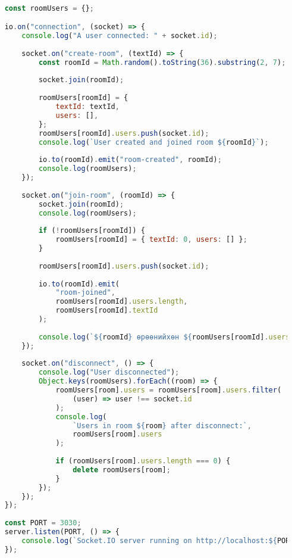 \begin{lstlisting}[language=Javascript, frame=single]

	const roomUsers = {};

	io.on("connection", (socket) => {
		console.log("A user connected: " + socket.id);
	
		socket.on("create-room", (textId) => {
			const roomId = Math.random().toString(36).substring(2, 7);
	
			socket.join(roomId);
	
			roomUsers[roomId] = {
				textId: textId,
				users: [],
			};
			roomUsers[roomId].users.push(socket.id);
			console.log(`User created and joined room ${roomId}`);
	
			io.to(roomId).emit("room-created", roomId);
			console.log(roomUsers);
		});
	
		socket.on("join-room", (roomId) => {
			socket.join(roomId);
			console.log(roomUsers);
	
			if (!roomUsers[roomId]) {
				roomUsers[roomId] = { textId: 0, users: [] };
			}
	
			roomUsers[roomId].users.push(socket.id);
	
			io.to(roomId).emit(
				"room-joined",
				roomUsers[roomId].users.length,
				roomUsers[roomId].textId
			);
	
			console.log(`${roomId} өрөөнийхөн ${roomUsers[roomId].users}`);
		});
	
		socket.on("disconnect", () => {
			console.log("User disconnected");
			Object.keys(roomUsers).forEach((room) => {
				roomUsers[room].users = roomUsers[room].users.filter(
					(user) => user !== socket.id
				);
				console.log(
					`Users in room ${room} after disconnect:`,
					roomUsers[room].users
				);
	
				if (roomUsers[room].users.length === 0) {
					delete roomUsers[room];
				}
			});
		});
	});
	
	const PORT = 3030;
	server.listen(PORT, () => {
		console.log(`Socket.IO server running on http://localhost:${PORT}`);
	});	
\end{lstlisting}

% 